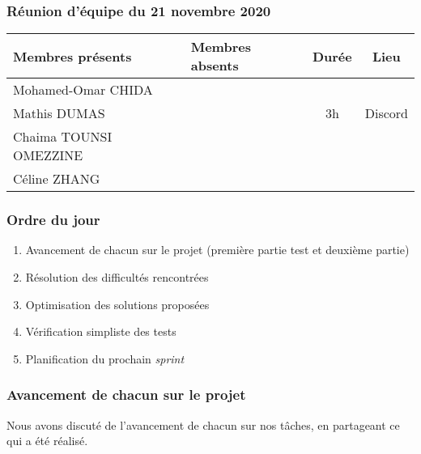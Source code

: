


% 
\subsubsection*{\large{Réunion d'équipe du 21 novembre 2020}}
\begin{center}
\begin{tabular}{| l | l || c | c |}
    \hline
    Membres présents & Membres absents & Durée & Lieu \\
    \hline
    Mohamed-Omar CHIDA & & & \\ Mathis DUMAS & & 3h & Discord \\ Chaima TOUNSI OMEZZINE & & & \\ Céline ZHANG & & & \\
    \hline
\end{tabular}
\end{center}

\subsubsection*{Ordre du jour}
\begin{enumerate}
    \item Avancement de chacun sur le projet (première partie test et deuxième partie)
    \item Résolution des difficultés rencontrées
    \item Optimisation des solutions proposées
    \item Vérification simpliste des tests
    \item Planification du prochain \textsl{sprint}
\end{enumerate}

\subsubsection*{Avancement de chacun sur le projet}
Nous avons discuté de l'avancement de chacun sur nos tâches, en partageant ce qui a été réalisé.
